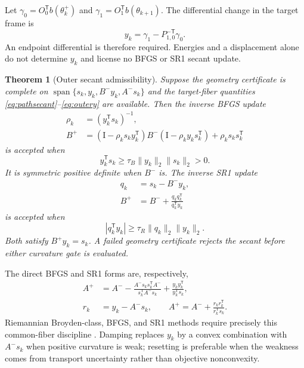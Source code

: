 \documentclass[10pt,twocolumn]{article}
\newtheorem{theorem}{Theorem}[section]
\theoremstyle{definition}
\theoremstyle{remark}
\newcommand{\Id}{\mathrm I}
\newcommand{\Span}{\operatorname{span}}
\begin{document}
Let $\gamma_0=O_0^{\mathsf T}b(\theta_k^+)$ and $\gamma_1=O_1^{\mathsf T}b(\theta_{k+1})$.  The differential change in the target frame is
\begin{equation}
 y_k=\gamma_1-P_{1,0}^{-\mathsf T}\gamma_0.
 \label{eq:outery}
\end{equation}
An endpoint differential is therefore required.  Energies and a displacement alone do not determine $y_k$ and license no BFGS or SR1 secant update.

\begin{theorem}[Outer secant admissibility]
Suppose the geometry certificate is complete on $\Span\{s_k,y_k,B^-y_k,A^-s_k\}$ and the target-fiber quantities \eqref{eq:pathsecant}--\eqref{eq:outery} are available.  Then the inverse BFGS update
\begin{align}
 \rho_k&=(y_k^{\mathsf T}s_k)^{-1},\nonumber\\
 B^+&=(\Id-\rho_ks_ky_k^{\mathsf T})B^-
 (\Id-\rho_ky_ks_k^{\mathsf T})+\rho_ks_ks_k^{\mathsf T}
 \label{eq:ibfgs}
\end{align}
is accepted when
\begin{equation}
 y_k^{\mathsf T}s_k\ge\tau_B\|y_k\|_2\|s_k\|_2>0.
 \label{eq:bfgsgate}
\end{equation}
It is symmetric positive definite when $B^-$ is.  The inverse SR1 update
\begin{align}
 q_k&=s_k-B^-y_k,\nonumber\\
 B^+&=B^-+\frac{q_kq_k^{\mathsf T}}{q_k^{\mathsf T}y_k}
 \label{eq:isr1}
\end{align}
is accepted when
\begin{equation}
 |q_k^{\mathsf T}y_k|\ge\tau_R\|q_k\|_2\|y_k\|_2.
 \label{eq:sr1gate}
\end{equation}
Both satisfy $B^+y_k=s_k$.  A failed geometry certificate rejects the secant before either curvature gate is evaluated.
\end{theorem}

The direct BFGS and SR1 forms are, respectively,
\begin{align}
 A^+&=A^--\frac{A^-s_ks_k^{\mathsf T}A^-}{s_k^{\mathsf T}A^-s_k}
 +\frac{y_ky_k^{\mathsf T}}{y_k^{\mathsf T}s_k},
 \label{eq:dbfgs}\\
 r_k&=y_k-A^-s_k,\qquad
 A^+=A^-+\frac{r_kr_k^{\mathsf T}}{r_k^{\mathsf T}s_k}.
 \label{eq:dsr1}
\end{align}
Riemannian Broyden-class, BFGS, and SR1 methods require precisely this common-fiber discipline \cite{Huang2015,Huang2018,HuangSR1}.  Damping replaces $y_k$ by a convex combination with $A^-s_k$ when positive curvature is weak; resetting is preferable when the weakness comes from transport uncertainty rather than objective nonconvexity.
\end{document}
